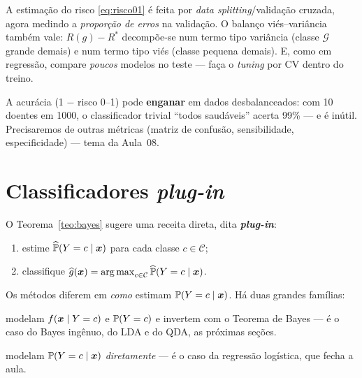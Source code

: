 \documentclass[11pt,a4paper]{article}
\begin{document}
\begin{observacao}
A estimação do risco \eqref{eq:risco01} é feita por \emph{data splitting}/validação
cruzada, agora medindo a \emph{proporção de erros} na validação. O balanço
viés--variância também vale: $R(g)-R^*$ decompõe-se num termo tipo variância (classe
$\mathcal{G}$ grande demais) e num termo tipo viés (classe pequena demais). E, como
em regressão, compare \emph{poucos} modelos no teste --- faça o \emph{tuning} por CV
dentro do treino.
\end{observacao}

\begin{atencao}
A acurácia (1 $-$ risco 0--1) pode \textbf{enganar} em dados desbalanceados: com 10
doentes em 1000, o classificador trivial ``todos saudáveis'' acerta 99\% --- e é
inútil. Precisaremos de outras métricas (matriz de confusão, sensibilidade,
especificidade) --- tema da Aula~08.
\end{atencao}

\section{Classificadores \emph{plug-in}}
O Teorema~\ref{teo:bayes} sugere uma receita direta, dita \textbf{\emph{plug-in}}:
\begin{enumerate}[leftmargin=1.6cm,nosep]
  \item estime $\widehat{\mathbb{P}}(Y=c\mid\bm{x})$ para cada classe $c\in\mathcal{C}$;
  \item classifique $\ghat(\x)=\argmax_{c\in\mathcal{C}}\widehat\Prob(Y=c\mid\x)$.
\end{enumerate}
Os métodos diferem em \emph{como} estimam $\mathbb{P}(Y=c\mid\bm{x})$. Há duas grandes
famílias:
\begin{description}[leftmargin=2.6cm,style=nextline]
  \item[Generativos] modelam $f(\bm{x}\mid Y=c)$ e $\mathbb{P}(Y=c)$ e invertem com o
        Teorema de Bayes --- é o caso do Bayes ingênuo, do LDA e do QDA, as
        próximas seções.
  \item[Discriminativos] modelam $\mathbb{P}(Y=c\mid\bm{x})$ \emph{diretamente} --- é o caso
        da regressão logística, que fecha a aula.
\end{description}

\end{document}
